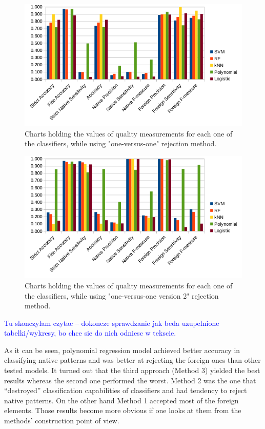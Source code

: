 \documentclass{llncs}
\begin{document}
\begin{figure}[!htb]
	\centering
	\includegraphics[width=1.0\textwidth]{_Figures/Method2_Chart.png}
	\caption{ Charts holding the values of quality measurements for each one of the classifiers, while using "one-versus-one" rejection method.  }
	\label{fig:resultcharts}
\end{figure}

\begin{figure}[!htb]
	\centering
	\includegraphics[width=1.0\textwidth]{_Figures/Method3_Chart.png}
	\caption{ Charts holding the values of quality measurements for each one of the classifiers, while using "one-versus-one version 2" rejection method.  }
	\label{fig:resultcharts}
\end{figure}


\textcolor{blue}{Tu skonczylam czytac -- dokoncze sprawdzanie jak beda uzupelnione tabelki/wykresy, bo chce sie do nich odniesc w tekscie.}


As it can be seen, polynomial regression model achieved better accuracy in classifying native patterns and was better at rejecting the foreign ones than other tested models. It turned out that the third approach (Method 3) yielded the best results whereas the second one performed the worst. Method 2 was the one that ``destroyed'' classification capabilities of classifiers and had tendency to reject native patterns. On the other hand Method 1 accepted most of the foreign elements. Those results become more obvious if one looks at them from the methods' construction point of view. 
\end{document}
